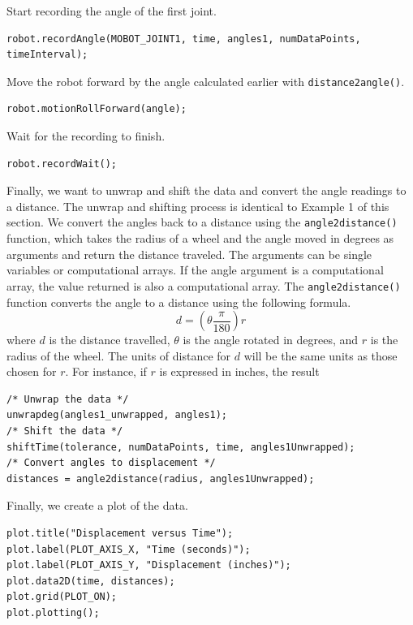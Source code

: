 \documentclass{article}
\begin{document}
Start recording the angle of the first joint.
\begin{verbatim}
robot.recordAngle(MOBOT_JOINT1, time, angles1, numDataPoints, timeInterval);
\end{verbatim}

Move the robot forward by the angle calculated earlier with \texttt{distance2angle()}.
\begin{verbatim}
robot.motionRollForward(angle);
\end{verbatim}

Wait for the recording to finish.
\begin{verbatim}
robot.recordWait();
\end{verbatim}

Finally, we want to unwrap and shift the data and convert the angle readings to a distance.
The unwrap and shifting process is identical to Example 1 of this section. 
We convert the angles back to a distance using the \texttt{angle2distance()} function,
which takes the radius of a wheel and the angle moved in degrees as arguments and
return the distance traveled. The arguments can be single variables or computational
arrays. If the angle argument is a computational array, the value returned is also
a computational array. The \texttt{angle2distance()} function converts the angle
to a distance using the following formula.
\begin{equation*}
d = \left(\theta \frac{\pi}{180}\right) r
\end{equation*}
where $d$ is the distance travelled, $\theta$ is the angle rotated in degrees, and $r$ is the
radius of the wheel. The units of distance for $d$ will be the same units as those
chosen for $r$. For instance, if $r$ is expressed in inches, the result 

\begin{verbatim}
/* Unwrap the data */
unwrapdeg(angles1_unwrapped, angles1);
/* Shift the data */
shiftTime(tolerance, numDataPoints, time, angles1Unwrapped);
/* Convert angles to displacement */
distances = angle2distance(radius, angles1Unwrapped);
\end{verbatim}

Finally, we create a plot of the data.
\begin{verbatim}
plot.title("Displacement versus Time");
plot.label(PLOT_AXIS_X, "Time (seconds)");
plot.label(PLOT_AXIS_Y, "Displacement (inches)");
plot.data2D(time, distances);
plot.grid(PLOT_ON);
plot.plotting();
\end{verbatim}
\end{document}
